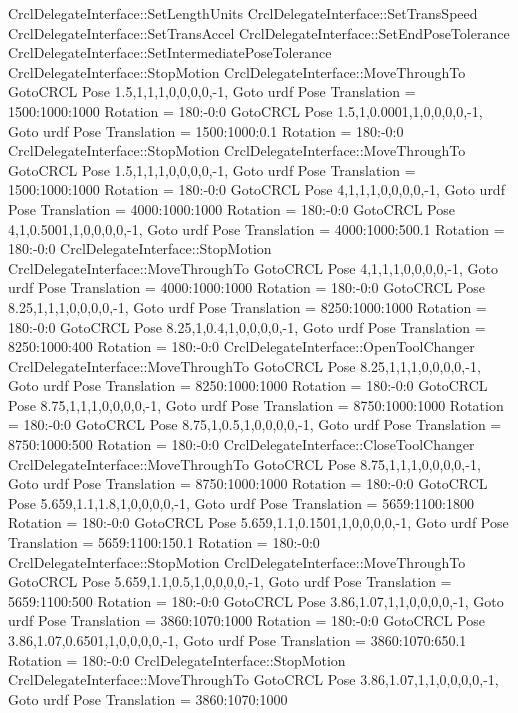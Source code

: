 \begin{DoxyVerb}CrclDelegateInterface::SetLengthUnits
CrclDelegateInterface::SetTransSpeed
CrclDelegateInterface::SetTransAccel
CrclDelegateInterface::SetEndPoseTolerance
CrclDelegateInterface::SetIntermediatePoseTolerance
CrclDelegateInterface::StopMotion
CrclDelegateInterface::MoveThroughTo
GotoCRCL Pose 1.5,1,1,1,0,0,0,0,-1,
Goto urdf Pose Translation = 1500:1000:1000
Rotation = 180:-0:0
GotoCRCL Pose 1.5,1,0.0001,1,0,0,0,0,-1,
Goto urdf Pose Translation = 1500:1000:0.1
Rotation = 180:-0:0
CrclDelegateInterface::StopMotion
CrclDelegateInterface::MoveThroughTo
GotoCRCL Pose 1.5,1,1,1,0,0,0,0,-1,
Goto urdf Pose Translation = 1500:1000:1000
Rotation = 180:-0:0
GotoCRCL Pose 4,1,1,1,0,0,0,0,-1,
Goto urdf Pose Translation = 4000:1000:1000
Rotation = 180:-0:0
GotoCRCL Pose 4,1,0.5001,1,0,0,0,0,-1,
Goto urdf Pose Translation = 4000:1000:500.1
Rotation = 180:-0:0
CrclDelegateInterface::StopMotion
CrclDelegateInterface::MoveThroughTo
GotoCRCL Pose 4,1,1,1,0,0,0,0,-1,
Goto urdf Pose Translation = 4000:1000:1000
Rotation = 180:-0:0
GotoCRCL Pose 8.25,1,1,1,0,0,0,0,-1,
Goto urdf Pose Translation = 8250:1000:1000
Rotation = 180:-0:0
GotoCRCL Pose 8.25,1,0.4,1,0,0,0,0,-1,
Goto urdf Pose Translation = 8250:1000:400
Rotation = 180:-0:0
CrclDelegateInterface::OpenToolChanger
CrclDelegateInterface::MoveThroughTo
GotoCRCL Pose 8.25,1,1,1,0,0,0,0,-1,
Goto urdf Pose Translation = 8250:1000:1000
Rotation = 180:-0:0
GotoCRCL Pose 8.75,1,1,1,0,0,0,0,-1,
Goto urdf Pose Translation = 8750:1000:1000
Rotation = 180:-0:0
GotoCRCL Pose 8.75,1,0.5,1,0,0,0,0,-1,
Goto urdf Pose Translation = 8750:1000:500
Rotation = 180:-0:0
CrclDelegateInterface::CloseToolChanger
CrclDelegateInterface::MoveThroughTo
GotoCRCL Pose 8.75,1,1,1,0,0,0,0,-1,
Goto urdf Pose Translation = 8750:1000:1000
Rotation = 180:-0:0
GotoCRCL Pose 5.659,1.1,1.8,1,0,0,0,0,-1,
Goto urdf Pose Translation = 5659:1100:1800
Rotation = 180:-0:0
GotoCRCL Pose 5.659,1.1,0.1501,1,0,0,0,0,-1,
Goto urdf Pose Translation = 5659:1100:150.1
Rotation = 180:-0:0
CrclDelegateInterface::StopMotion
CrclDelegateInterface::MoveThroughTo
GotoCRCL Pose 5.659,1.1,0.5,1,0,0,0,0,-1,
Goto urdf Pose Translation = 5659:1100:500
Rotation = 180:-0:0
GotoCRCL Pose 3.86,1.07,1,1,0,0,0,0,-1,
Goto urdf Pose Translation = 3860:1070:1000
Rotation = 180:-0:0
GotoCRCL Pose 3.86,1.07,0.6501,1,0,0,0,0,-1,
Goto urdf Pose Translation = 3860:1070:650.1
Rotation = 180:-0:0
CrclDelegateInterface::StopMotion
CrclDelegateInterface::MoveThroughTo
GotoCRCL Pose 3.86,1.07,1,1,0,0,0,0,-1,
Goto urdf Pose Translation = 3860:1070:1000

\end{DoxyVerb}
